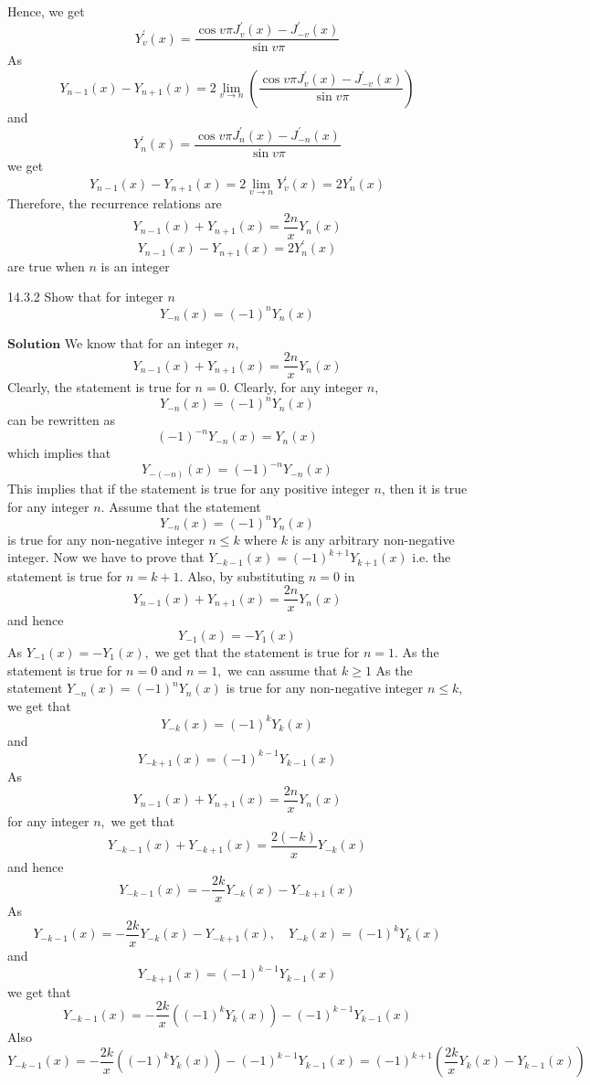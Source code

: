 Hence, we get
$$
Y_{v}^{\prime}(x)=\frac{\cos v \pi J_{v}^{\prime}(x)-J_{-v}^{\prime}(x)}{\sin v \pi}
$$
As
$$
Y_{n-1}(x)-Y_{n+1}(x)=2 \lim _{v \rightarrow n}\left(\frac{\cos v \pi J_{v}^{\prime}(x)-J_{-v}^{\prime}(x)}{\sin v \pi}\right)
$$
and
$$
Y_{n}^{\prime}(x)=\frac{\cos v \pi J_{n}^{\prime}(x)-J_{-n}^{\prime}(x)}{\sin v \pi}
$$
we get
$$
Y_{n-1}(x)-Y_{n+1}(x)=2 \lim _{v \rightarrow n} Y_{v}^{\prime}(x)=2 Y_{n}^{\prime}(x)
$$
Therefore, the recurrence relations are
$$
Y_{n-1}(x)+Y_{n+1}(x)=\frac{2 n}{x} Y_{n}(x)
$$
$$
Y_{n-1}(x)-Y_{n+1}(x)=2 Y_{n}^{\prime}(x)
$$
are true when $n$ is an integer






\newpage


\begin{mybox}{14.3.2}
Show that for integer $n$
$$
Y_{-n}(x)=(-1)^{n} Y_{n}(x)
$$
\end{mybox}
$\boxed{\textbf{Solution}}$  We know that for an integer $n$, 
$$Y_{n-1}(x)+Y_{n+1}(x)=\frac{2 n}{x} Y_{n}(x)$$ Clearly, the statement is true for $n=0$. Clearly, for any integer $n$, 
$$Y_{-n}(x)=(-1)^{n} Y_{n}(x)$$
can be rewritten as 
$$(-1)^{-n} Y_{-n}(x)=Y_{n}(x)$$ 
which implies that 
$$Y_{-(-n)}(x)=(-1)^{-n} Y_{-n}(x)$$
This implies that if the statement is true for any positive integer $n$, then it is true for any
integer $n$. Assume that the statement 
$$Y_{-n}(x)=(-1)^{n} Y_{n}(x)$$ 
is true for any non-negative integer $n \leq k$ where $k$ is any arbitrary non-negative integer. Now we have to prove that $Y_{-k-1}(x)=(-1)^{k+1} Y_{k+1}(x)$ i.e. the statement is true for $n=k+1$. Also, by substituting $n=0$ in
$$
Y_{n-1}(x)+Y_{n+1}(x)=\frac{2 n}{x} Y_{n}(x)
$$
and hence
$$
Y_{-1}(x)=-Y_{1}(x)
$$
As $Y_{-1}(x)=-Y_{1}(x),$ we get that the statement is true for $n=1$. As the statement is true for $n=0$ and $n=1,$ we can assume that $k \geq 1$
As the statement $Y_{-n}(x)=(-1)^{n} Y_{n}(x)$ is true for any non-negative integer $n \leq k,$ we get that 
$$Y_{-k}(x)=(-1)^{k} Y_{k}(x)$$ 
and 
$$Y_{-k+1}(x)=(-1)^{k-1} Y_{k-1}(x)$$
As 
$$Y_{n-1}(x)+Y_{n+1}(x)=\frac{2 n}{x} Y_{n}(x)$$
for any integer $n,$ we get that 
$$Y_{-k-1}(x)+Y_{-k+1}(x)=\frac{2(-k)}{x} Y_{-k}(x)$$ 
and hence 
$$Y_{-k-1}(x)=-\frac{2 k}{x} Y_{-k}(x)-Y_{-k+1}(x)$$
As 
$$Y_{-k-1}(x)=-\frac{2 k}{x} Y_{-k}(x)-Y_{-k+1}(x), \quad Y_{-k}(x)=(-1)^{k} Y_{k}(x)$$
and 
$$Y_{-k+1}(x)=(-1)^{k-1} Y_{k-1}(x)$$
we get that 
$$Y_{-k-1}(x)=-\frac{2 k}{x}\left((-1)^{k} Y_{k}(x)\right)-(-1)^{k-1} Y_{k-1}(x)$$
Also 
$$Y_{-k-1}(x)=-\frac{2 k}{x}\left((-1)^{k} Y_{k}(x)\right)-(-1)^{k-1} Y_{k-1}(x)=(-1)^{k+1}\left(\frac{2 k}{x} Y_{k}(x)-Y_{k-1}(x)\right)$$

